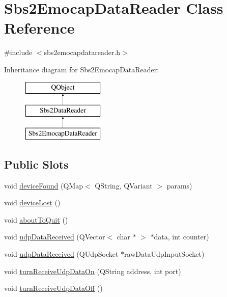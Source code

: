 \hypertarget{classSbs2EmocapDataReader}{\section{Sbs2\-Emocap\-Data\-Reader Class Reference}
\label{classSbs2EmocapDataReader}
}


{\ttfamily \#include $<$sbs2emocapdatareader.\-h$>$}

Inheritance diagram for Sbs2\-Emocap\-Data\-Reader\-:\begin{figure}[H]
\begin{center}
\leavevmode
\includegraphics[height=3.000000cm]{classSbs2EmocapDataReader}
\end{center}
\end{figure}
\subsection*{Public Slots}
\begin{DoxyCompactItemize}
\item 
void \hyperlink{classSbs2EmocapDataReader_ab47ef67e7956bd710aedd233f127498b}{device\-Found} (Q\-Map$<$ Q\-String, Q\-Variant $>$ params)
\item 
void \hyperlink{classSbs2EmocapDataReader_a799188dcf1f2499e592bf3bf70eef282}{device\-Lost} ()
\item 
void \hyperlink{classSbs2EmocapDataReader_a327f5896de2f2c9bd995db3b921b7004}{about\-To\-Quit} ()
\item 
void \hyperlink{classSbs2EmocapDataReader_a2afdbee6829e11aaf34b250c87503323}{udp\-Data\-Received} (Q\-Vector$<$ char $\ast$ $>$ $\ast$data, int counter)
\item 
void \hyperlink{classSbs2EmocapDataReader_a41a4b861c75eacdc2ff6dbace6ddd4fd}{udp\-Data\-Received} (Q\-Udp\-Socket $\ast$raw\-Data\-Udp\-Input\-Socket)
\item 
void \hyperlink{classSbs2EmocapDataReader_a6923ac53e782bc04a0f346836a237b01}{turn\-Receive\-Udp\-Data\-On} (Q\-String address, int port)
\item 
void \hyperlink{classSbs2EmocapDataReader_af747a8d7ecef45e0502dcd6788f01bcf}{turn\-Receive\-Udp\-Data\-Off} ()
\end{DoxyCompactItemize}
